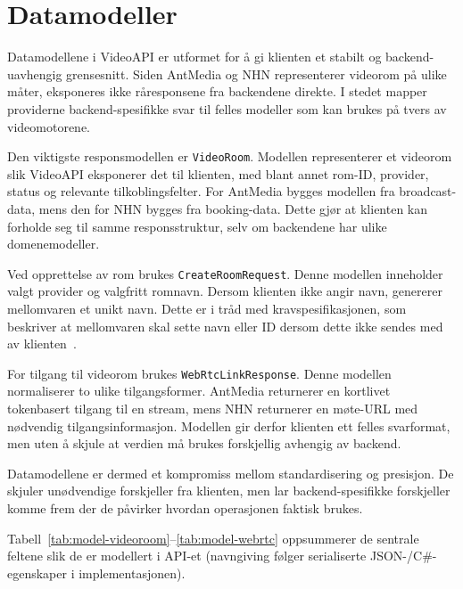 \section{Datamodeller}
\label{sec:datamodeller}

Datamodellene i VideoAPI er utformet for å gi klienten et stabilt og
backend-uavhengig grensesnitt. Siden AntMedia og NHN representerer videorom på
ulike måter, eksponeres ikke råresponsene fra backendene direkte. I stedet mapper
providerne backend-spesifikke svar til felles modeller som kan brukes på tvers av
videomotorene.

Den viktigste responsmodellen er \texttt{VideoRoom}. Modellen representerer et
videorom slik VideoAPI eksponerer det til klienten, med blant annet rom-ID,
provider, status og relevante tilkoblingsfelter. For AntMedia bygges modellen fra
broadcast-data, mens den for NHN bygges fra booking-data. Dette gjør at klienten
kan forholde seg til samme responsstruktur, selv om backendene har ulike
domenemodeller.

Ved opprettelse av rom brukes \texttt{CreateRoomRequest}. Denne modellen
inneholder valgt provider og valgfritt romnavn. Dersom klienten ikke angir navn,
genererer mellomvaren et unikt navn. Dette er i tråd med kravspesifikasjonen,
som beskriver at mellomvaren skal sette navn eller ID dersom dette ikke sendes
med av klienten~\cite{hdo_kravspec}.

For tilgang til videorom brukes \texttt{WebRtcLinkResponse}. Denne modellen
normaliserer to ulike tilgangsformer. AntMedia returnerer en kortlivet
tokenbasert tilgang til en stream, mens NHN returnerer en møte-URL med nødvendig
tilgangsinformasjon. Modellen gir derfor klienten ett felles svarformat, men
uten å skjule at verdien må brukes forskjellig avhengig av backend.

Datamodellene er dermed et kompromiss mellom standardisering og presisjon. De
skjuler unødvendige forskjeller fra klienten, men lar backend-spesifikke
forskjeller komme frem der de påvirker hvordan operasjonen faktisk brukes.

Tabell~\ref{tab:model-videoroom}–\ref{tab:model-webrtc} oppsummerer de sentrale
feltene slik de er modellert i API-et (navngiving følger serialiserte
JSON-/C\#-egenskaper i implementasjonen).

